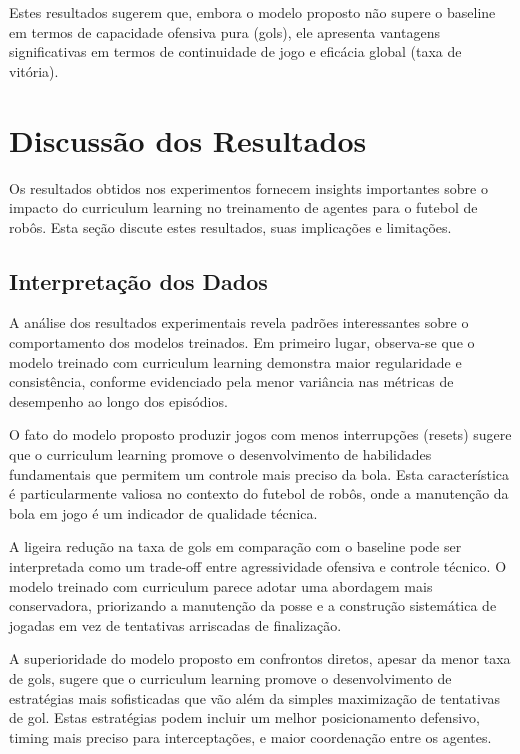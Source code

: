Estes resultados sugerem que, embora o modelo proposto não supere o baseline em termos de capacidade ofensiva pura (gols), ele apresenta vantagens significativas em termos de continuidade de jogo e eficácia global (taxa de vitória).

\section{Discussão dos Resultados}
\label{sec:discussao_resultados}

Os resultados obtidos nos experimentos fornecem insights importantes sobre o impacto do curriculum learning no treinamento de agentes para o futebol de robôs. Esta seção discute estes resultados, suas implicações e limitações.

\subsection{Interpretação dos Dados}

A análise dos resultados experimentais revela padrões interessantes sobre o comportamento dos modelos treinados. Em primeiro lugar, observa-se que o modelo treinado com curriculum learning demonstra maior regularidade e consistência, conforme evidenciado pela menor variância nas métricas de desempenho ao longo dos episódios.

O fato do modelo proposto produzir jogos com menos interrupções (resets) sugere que o curriculum learning promove o desenvolvimento de habilidades fundamentais que permitem um controle mais preciso da bola. Esta característica é particularmente valiosa no contexto do futebol de robôs, onde a manutenção da bola em jogo é um indicador de qualidade técnica.

A ligeira redução na taxa de gols em comparação com o baseline pode ser interpretada como um trade-off entre agressividade ofensiva e controle técnico. O modelo treinado com curriculum parece adotar uma abordagem mais conservadora, priorizando a manutenção da posse e a construção sistemática de jogadas em vez de tentativas arriscadas de finalização.

A superioridade do modelo proposto em confrontos diretos, apesar da menor taxa de gols, sugere que o curriculum learning promove o desenvolvimento de estratégias mais sofisticadas que vão além da simples maximização de tentativas de gol. Estas estratégias podem incluir um melhor posicionamento defensivo, timing mais preciso para interceptações, e maior coordenação entre os agentes.

